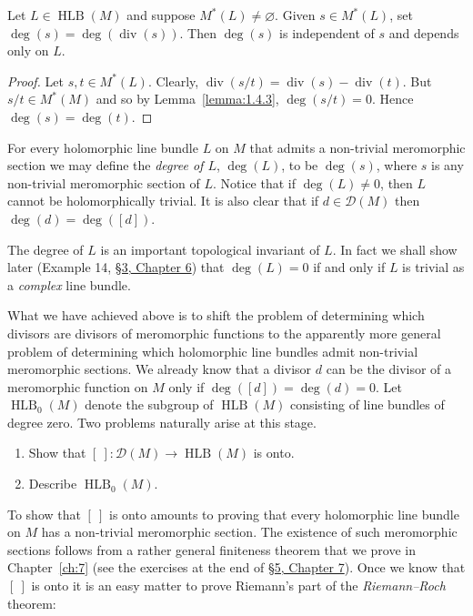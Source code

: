  Let $L\in\operatorname{HLB}(M)$ and suppose $M^*(L)\ne\varnothing$. Given $s\in M^*(L)$, set $\deg(s)=\deg(\operatorname{div}(s))$. Then $\deg(s)$ is independent of $s$ and depends only on $L$.
\begin{proof}
Let $s,t\in M^*(L)$. Clearly, $\operatorname{div}(s/t)=\operatorname{div}(s)-\operatorname{div}(t)$. But $s/t\in M^*(M)$ and so by Lemma~\ref{lemma:1.4.3}, $\deg(s/t)=0$. Hence $\deg(s)=\deg(t)$.
\end{proof}
For every holomorphic line bundle $L$ on $M$ that admits a non-trivial meromorphic section we may define the \emph{degree of $L$}, $\deg(L)$, to be $\deg(s)$, where $s$ is any non-trivial meromorphic section of $L$. Notice that if $\deg(L)\ne0$, then $L$ cannot be holomorphically trivial. It is also clear that if $d\in\mathcal D(M)$ then $\deg(d)=\deg([d])$.

The degree of $L$ is an important topological invariant of $L$. In fact we shall show later (Example 14, \hyperref[sec:6:3]{\S3, Chapter 6}) that $\deg(L)=0$ if and only if $L$ is trivial as a \emph{complex} line bundle.

What we have achieved above is to shift the problem of determining which divisors are divisors of meromorphic functions to the apparently more general problem of determining which holomorphic line bundles admit non-trivial meromorphic sections. We already know that a divisor $d$ can be the divisor of a meromorphic function on $M$ only if $\deg([d])=\deg(d)=0$. Let $\operatorname{HLB}_0(M)$ denote the subgroup of $\operatorname{HLB}(M)$ consisting of line bundles of degree zero. Two problems naturally arise at this stage.
\begin{enumerate}
\item Show that $[\ ]:\mathcal D(M)\to\operatorname{HLB}(M)$ is onto.
\item Describe $\operatorname{HLB}_0(M)$.
\end{enumerate}
To show that $[\ ]$ is onto amounts to proving that every holomorphic line bundle on $M$ has a non-trivial meromorphic section. The existence of such meromorphic sections follows from a rather general finiteness theorem that we prove in Chapter~\ref{ch:7} (see the exercises at the end of \hyperref[sec:7:5]{\S5, Chapter 7}). Once we know that $[\ ]$ is onto it is an easy matter to prove Riemann's part of the \emph{Riemann--Roch} theorem:


